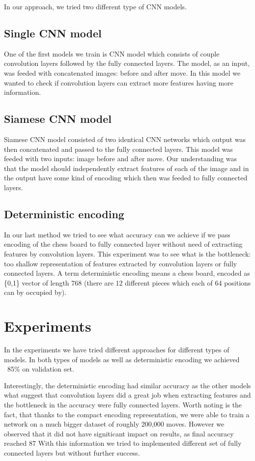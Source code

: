 \documentclass[10pt,twocolumn,letterpaper]{article}
\begin{document}
In our approach, we tried two different type of CNN models.

\subsection{Single CNN model}

One of the first models we train is CNN model which consists of couple convolution
layers followed by the fully connected layers. The model, as an input, was feeded
with concatenated images: before and after move. In this model we wanted to check
if convolution layers can extract more features having more information.

\subsection{Siamese CNN model}

Siamese CNN model consisted of two identical CNN networks which output was then
concatenated and passed to the fully connected layers. This model was feeded
with two inputs: image before and after move. Our understanding was that the
model should independently extract features of each of the image and in the
output have some kind of encoding which then was feeded to fully connected
layers.

\subsection{Deterministic encoding}

In our last method we tried to see what accuracy can we achieve if we pass
encoding of the chess board to fully connected layer without need of extracting
features by convolution layers. This experiment was to see what is the bottleneck:
too shallow representation of features extracted by convolution layers or fully
connected layers. A term deterministic encoding means a chess board, encoded as
\{0,1\} vector of length 768 (there are 12 different pieces which each of 
64 positions can by occupied by).

\section{Experiments}

In the experiments we have tried different approaches for different types of
models. In both types of models as well as deterministic encoding we achieved
~85\% on validation set.

Interestingly, the deterministic encoding had similar accuracy as the other models
what suggest that convolution layers did a great job when extracting features
and the bottleneck in the accuracy were fully connected layers. Worth noting is the fact, 
that thanks to the compact encoding representation, we were able to train a network on a 
much bigger dataset of roughly 200,000 moves.
However we observed that it did not have signiticant impact on results, as final
accuracy reached 87%
With this information we tried to implemented different set of fully 
connected layers but without further success. 
\end{document}
